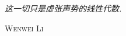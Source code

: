 
\vspace*{\fill}

\Large\textit{这一切只是虚张声势的线性代数. }

\bigskip

\begin{flushright}
    \sffamily\scshape Wenwei Li
\end{flushright}

\normalfont\normalsize

\vspace*{\fill}
